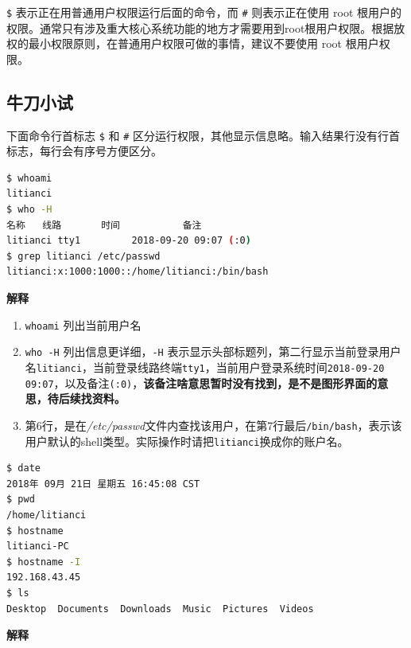 \documentclass[doctor,openright,twoside]{sjtuthesis}
\providecommand{\tightlist}{%
    \setlength{\itemsep}{0pt}\setlength{\parskip}{0pt}}
\newcommand{\passthrough}[1]{#1}
\theoremstyle{plain}
\theoremstyle{definition}
\theoremstyle{remark}
\theoremstyle{ocrenumbox}
\theoremstyle{plain}
\begin{document}
\passthrough{\lstinline!$!} 表示正在用普通用户权限运行后面的命令，而
\passthrough{\lstinline!#!} 则表示正在使用 root
根用户的权限。通常只有涉及重大核心系统功能的地方才需要用到root根用户权限。根据放权的最小权限原则，在普通用户权限可做的事情，建议不要使用
root 根用户权限。

\subsection{牛刀小试}

下面命令行首标志 \passthrough{\lstinline!$!} 和
\passthrough{\lstinline!#!}
区分运行权限，其他显示信息略。输入结果行没有行首标志，每行会有序号方便区分。

\begin{lstlisting}[language=bash]
$ whoami
litianci
$ who -H
名称   线路       时间           备注
litianci tty1         2018-09-20 09:07 (:0)
$ grep litianci /etc/passwd
litianci:x:1000:1000::/home/litianci:/bin/bash
\end{lstlisting}

\textbf{解释}

\begin{enumerate}
\def\labelenumi{\arabic{enumi}.}
\tightlist
\item
  \passthrough{\lstinline!whoami!} 列出当前用户名
\item
  \passthrough{\lstinline!who -H!}
  列出信息更详细，\passthrough{\lstinline!-H!}
  表示显示头部标题列，第二行显示当前登录用户名\passthrough{\lstinline!litianci!}，当前登录线路终端\passthrough{\lstinline!tty1!}，当前用户登录系统时间\passthrough{\lstinline!2018-09-20 09:07!}，以及备注\passthrough{\lstinline!(:0)!}，\textbf{该备注啥意思暂时没有找到，是不是图形界面的意思，待后续找资料。}
\item
  第6行，是在\emph{/etc/passwd}文件内查找该用户，在第7行最后\passthrough{\lstinline!/bin/bash!}，表示该用户默认的shell类型。实际操作时请把\passthrough{\lstinline!litianci!}换成你的账户名。
\end{enumerate}

\begin{lstlisting}[language=bash]
$ date
2018年 09月 21日 星期五 16:45:08 CST
$ pwd
/home/litianci
$ hostname
litianci-PC
$ hostname -I
192.168.43.45
$ ls
Desktop  Documents  Downloads  Music  Pictures  Videos
\end{lstlisting}

\textbf{解释}
\end{document}

